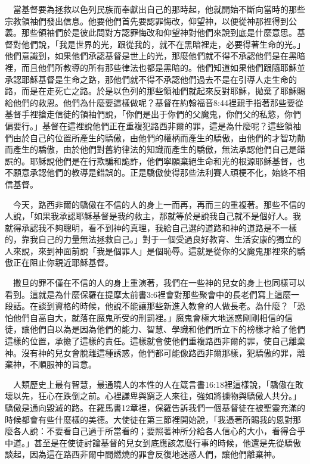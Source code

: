 \documentclass{book}
\begin{document}
　當基督要為拯救以色列民族而奉獻出自己的那時起，他就開始不斷向當時的那些宗教領袖們發出信息。他要他們首先要認罪悔改，仰望神，以便從神那裡得到公義。那些領袖們於是彼此問對方認罪悔改和仰望神對他們來說到底是什麼意思。基督對他們說，「我是世界的光，跟從我的，就不在黑暗裡走，必要得著生命的光。」他們意識到，如果他們承認基督是世上的光，那麼他們就不得不承認他們是在黑暗裡，而且他們所教導的所有那些律法也都是黑暗的。他們知道如果他們跟隨耶穌並承認耶穌基督是生命之路，那他們就不得不承認他們過去不是在引導人走生命的路，而是在走死亡之路。於是以色列的那些領袖們就起來反對耶穌，拋棄了耶穌賜給他們的救恩。他們為什麼要這樣做呢？基督在約翰福音8:44裡親手指著那些要從基督手裡搶走信徒的領袖們說，「你們是出于你們的父魔鬼，你們父的私慾，你們偏要行。」基督在這裡說他們正在重複犯路西非爾的罪，這是為什麼呢？這些領袖們由於自己的位置所產生的驕傲，由他們的權柄而產生的驕傲，由他們的才智功勣而產生的驕傲，由於他們對舊約律法的知識而產生的驕傲，無法承認他們自己是錯誤的。耶穌說他們是在行欺騙和詭詐，他們寧願棄絕生命和光的根源耶穌基督，也不願意承認他們的教導是錯誤的。正是驕傲使得那些法利賽人頑梗不化，始終不相信基督。

　今天，路西非爾的驕傲在不信的人的身上一而再，再而三的重複著。那些不信的人說，「如果我承認耶穌基督是我的救主，那就等於是說我自己就不是個好人。我就得承認我不夠聰明，看不到神的真理，我給自己選的道路和神的道路是不一樣的，靠我自己的力量無法拯救自己。」對于一個受過良好教育、生活安康的獨立的人來說，來到神面前說「我是個罪人」是個恥辱。這就是從你的父魔鬼那裡來的驕傲正在阻止你親近耶穌基督。

　撒旦的罪不僅在不信的人的身上重演著，我們在一些神的兒女的身上也同樣可以看到。這就是為什麼保羅在提摩太前書3:6裡會對那些聚會中的長老們寫上這麼一段話。在談到資格的時候，他說不能讓那些新進入教會的人做長老。為什麼？「恐怕他們自高自大，就落在魔鬼所受的刑罰裡。」魔鬼會極大地迷惑剛剛相信的信徒，讓他們自以為是因為他們的能力、智慧、學識和他們所立下的榜樣才給了他們這樣的位置，承擔了這樣的責任。這樣就會使他們重複路西非爾的罪，使自己離棄神。沒有神的兒女會脫離這種誘惑，他們都可能像路西非爾那樣，犯驕傲的罪，離棄神，不順服神的旨意。

　人類歷史上最有智慧，最通曉人的本性的人在箴言書16:18裡這樣說，「驕傲在敗壞以先，狂心在跌倒之前。心裡謙卑與窮乏人來往，強如將擄物與驕傲人共分。」驕傲是通向毀滅的路。在羅馬書12章裡，保羅告訴我們一個基督徒在被聖靈充滿的時候都會有些什麼樣的美德。大使徒在第三節裡開始說，「我憑著所賜我的恩對那麼各人說：不要看自己過于所當看的；要照著神所分給各人信心的大小，看得合乎中道。」甚至是在使徒討論基督的兒女到底應該怎麼行事的時候，他還是先從驕傲談起，因為這在路西非爾中間燃燒的罪會反復地迷惑人們，讓他們離棄神。
\end{document}
